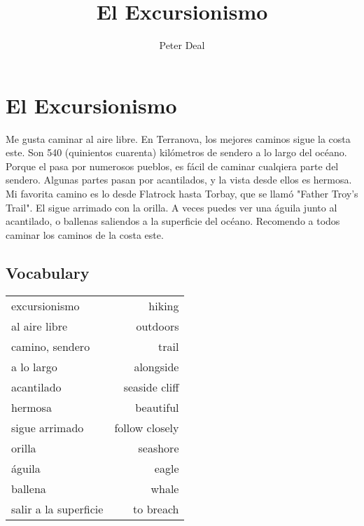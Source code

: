 \documentclass[12pt]{article}
\title{El Excursionismo}
\author{Peter Deal}
\begin{document}
\section*{El Excursionismo}

	Me gusta caminar al aire libre. En Terranova, los mejores caminos sigue la costa este. Son 540 (quinientos cuarenta) kilómetros de sendero a lo largo del océano. Porque el pasa por numerosos pueblos, es fácil de caminar cualqiera parte del sendero. Algunas partes pasan por acantilados, y la vista desde ellos es hermosa. Mi favorita camino es lo desde Flatrock hasta Torbay, que se llamó "Father Troy's Trail". El sigue arrimado con la orilla. A veces puedes ver una águila junto al acantilado, o ballenas saliendos a la superficie del océano. Recomendo a todos caminar los caminos de la costa este.

\subsection*{Vocabulary}

\begin{tabular}{l r}
excursionismo & hiking \\
al aire libre & outdoors \\
camino, sendero & trail \\
a lo largo & alongside \\
acantilado & seaside cliff \\
hermosa & beautiful \\
sigue arrimado & follow closely \\
orilla & seashore \\
águila & eagle \\
ballena & whale \\
salir a la superficie & to breach \\
\end{tabular}
\end{document}
